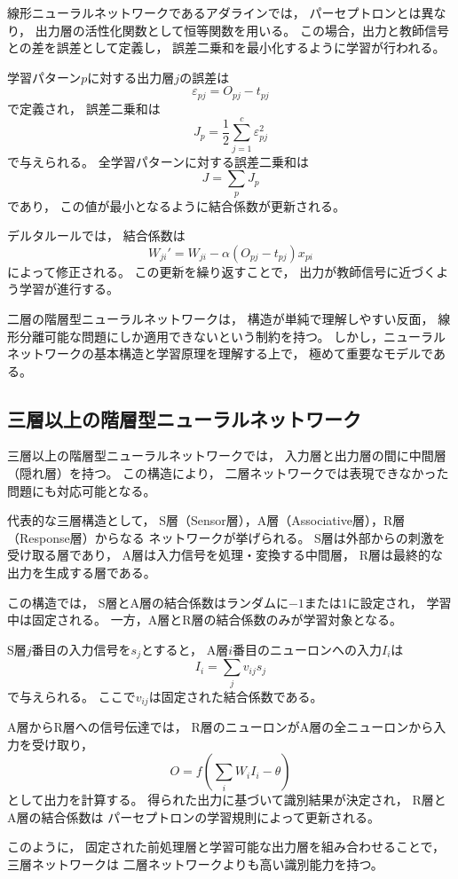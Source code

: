 線形ニューラルネットワークであるアダラインでは，
パーセプトロンとは異なり，
出力層の活性化関数として恒等関数を用いる。
この場合，出力と教師信号との差を誤差として定義し，
誤差二乗和を最小化するように学習が行われる。

学習パターン$p$に対する出力層$j$の誤差は
\[
\varepsilon_{pj} = O_{pj} - t_{pj}
\]
で定義され，
誤差二乗和は
\[
J_p = \frac{1}{2} \sum_{j=1}^{c} \varepsilon_{pj}^2
\]
で与えられる。
全学習パターンに対する誤差二乗和は
\[
J = \sum_p J_p
\]
であり，
この値が最小となるように結合係数が更新される。

デルタルールでは，
結合係数は
\[
W_{ji}' = W_{ji} - \alpha (O_{pj} - t_{pj}) x_{pi}
\]
によって修正される。
この更新を繰り返すことで，
出力が教師信号に近づくよう学習が進行する。

二層の階層型ニューラルネットワークは，
構造が単純で理解しやすい反面，
線形分離可能な問題にしか適用できないという制約を持つ。
しかし，ニューラルネットワークの基本構造と学習原理を理解する上で，
極めて重要なモデルである。


\subsection{三層以上の階層型ニューラルネットワーク}

三層以上の階層型ニューラルネットワークでは，
入力層と出力層の間に中間層（隠れ層）を持つ。
この構造により，
二層ネットワークでは表現できなかった問題にも対応可能となる。

代表的な三層構造として，
S層（Sensor層），A層（Associative層），R層（Response層）からなる
ネットワークが挙げられる。
S層は外部からの刺激を受け取る層であり，
A層は入力信号を処理・変換する中間層，
R層は最終的な出力を生成する層である。

この構造では，
S層とA層の結合係数はランダムに$-1$または$1$に設定され，
学習中は固定される。
一方，A層とR層の結合係数のみが学習対象となる。

S層$j$番目の入力信号を$s_j$とすると，
A層$i$番目のニューロンへの入力$I_i$は
\[
I_i = \sum_j v_{ij} s_j
\]
で与えられる。
ここで$v_{ij}$は固定された結合係数である。

A層からR層への信号伝達では，
R層のニューロンがA層の全ニューロンから入力を受け取り，
\[
O = f\!\left(\sum_i W_i I_i - \theta\right)
\]
として出力を計算する。
得られた出力に基づいて識別結果が決定され，
R層とA層の結合係数は
パーセプトロンの学習規則によって更新される。

このように，
固定された前処理層と学習可能な出力層を組み合わせることで，
三層ネットワークは
二層ネットワークよりも高い識別能力を持つ。


